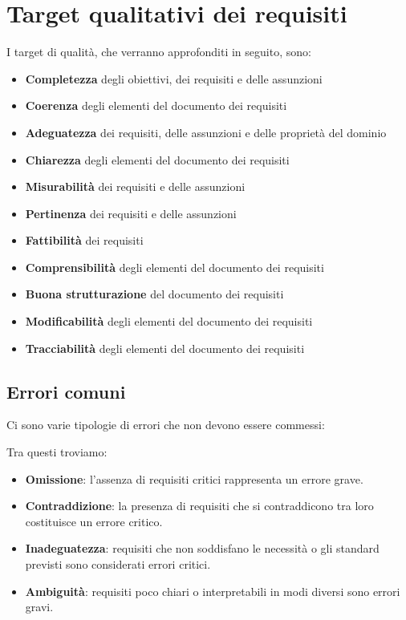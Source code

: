 \section{Target qualitativi dei requisiti}
I target di qualità, che verranno approfonditi in seguito, sono:
\begin{itemize}
    \item \textbf{Completezza} degli obiettivi, dei requisiti e delle assunzioni
    \item \textbf{Coerenza} degli elementi del documento dei requisiti
    \item \textbf{Adeguatezza} dei requisiti, delle assunzioni e delle proprietà del dominio
    \item \textbf{Chiarezza} degli elementi del documento dei requisiti 
    \item \textbf{Misurabilità} dei requisiti e delle assunzioni
    \item \textbf{Pertinenza} dei requisiti e delle assunzioni
    \item \textbf{Fattibilità} dei requisiti
    \item \textbf{Comprensibilità} degli elementi del documento dei requisiti
    \item \textbf{Buona strutturazione} del documento dei requisiti
    \item \textbf{Modificabilità} degli elementi del documento dei requisiti
    \item \textbf{Tracciabilità} degli elementi del documento dei requisiti
\end{itemize}
\subsection{Errori comuni}
Ci sono varie tipologie di errori che non devono essere commessi:

Tra questi troviamo:

\begin{itemize}
    \item \textbf{Omissione}: l'assenza di requisiti critici rappresenta un errore grave.
    \item \textbf{Contraddizione}: la presenza di requisiti che si contraddicono tra loro costituisce un errore critico.
    \item \textbf{Inadeguatezza}: requisiti che non soddisfano le necessità o gli standard previsti sono considerati errori critici.
    \item \textbf{Ambiguità}: requisiti poco chiari o interpretabili in modi diversi sono errori gravi.
\end{itemize}

